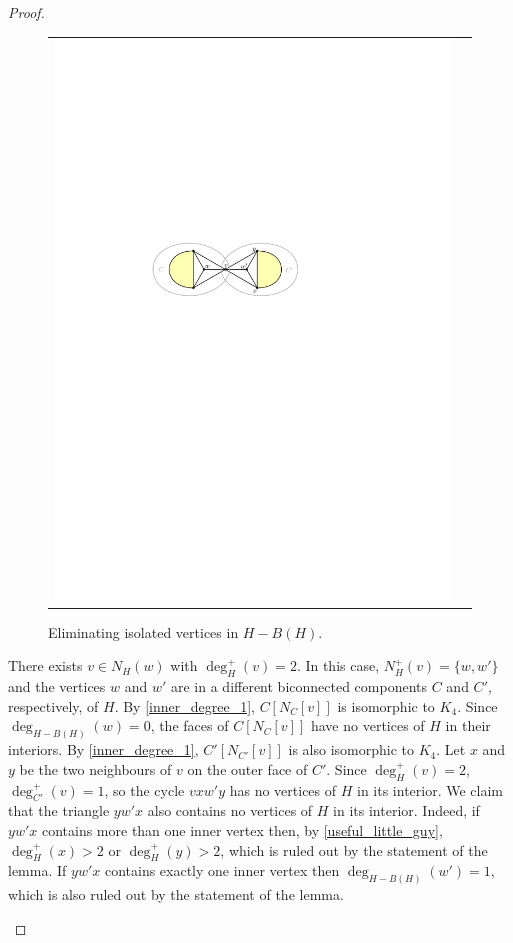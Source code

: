 \documentclass{article}
\theoremstyle{definition}
\begin{document}
\begin{proof}
\begin{figure}[htpb]
\begin{tabular}{cc}
      \includegraphics[page=4]{figs/isolated}
    \end{tabular}
    \caption{Eliminating isolated vertices in $H-B(H)$.}
    \label{isolated_fig}
  \end{figure}
  \begin{compactenum}[(a)]
    \item There exists $v\in N_H(w)$ with $\deg^+_H(v)=2$. In this case, $N^+_H(v)=\{w,w'\}$ and the vertices $w$ and $w'$ are in a different biconnected components $C$ and $C'$, respectively, of $H$. By \cref{inner_degree_1}, $C[N_C[v]]$ is isomorphic to $K_4$. Since $\deg_{H-B(H)}(w)=0$, the faces of $C[N_C[v]]$ have no vertices of $H$ in their interiors.   By \cref{inner_degree_1}, $C'[N_{C'}[v]]$ is also isomorphic to $K_4$.  Let $x$ and $y$ be the two neighbours of $v$ on the outer face of $C'$. Since $\deg^+_H(v)=2$, $\deg_{C'}^+(v)=1$, so the cycle $vxw'y$ has no vertices of $H$ in its interior.
    We claim that the triangle $yw'x$ also contains no vertices of $H$ in its interior. Indeed, if $yw'x$ contains more than one inner vertex then, by \cref{useful_little_guy}, $\deg^+_H(x)>2$ or $\deg^+_H(y)>2$, which is ruled out by the statement of the lemma.  If $yw'x$ contains exactly one inner vertex then $\deg_{H-B(H)}(w')=1$, which is also ruled out by the statement of the lemma.


\end{compactenum}
\end{proof}
\end{document}
